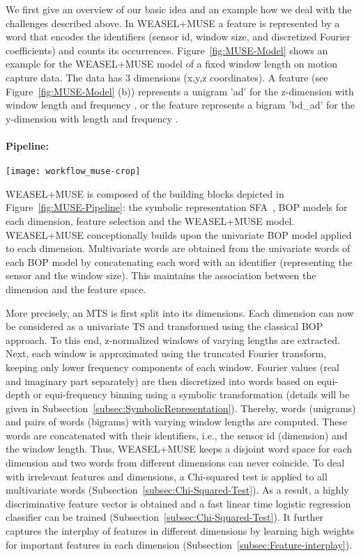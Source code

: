 \documentclass[sigconf]{acmart}
\begin{document}
We first give an overview of our basic idea and an example how we deal with the challenges described above. In WEASEL+MUSE a feature is represented by a word that encodes the identifiers (sensor id, window size, and discretized Fourier coefficients) and counts its occurrences. Figure~\ref{fig:MUSE-Model}  shows an example for the WEASEL+MUSE model of a fixed window length  on motion capture data. The data has 3 dimensions (x,y,z coordinates). A feature  (see Figure~\ref{fig:MUSE-Model} (b)) represents a unigram 'ad' for the z-dimension with window length  and frequency , or the feature  represents a bigram 'bd\_ad' for the y-dimension with length  and frequency .

\paragraph{Pipeline:}

\begin{figure*}
	\texttt{[image: workflow\_muse-crop]}
	\caption{WEASEL+MUSE Pipeline: Feature extraction, univariate Bag-of-Patterns (BOP) models and WEASEL+MUSE.\label{fig:MUSE-Pipeline}}
\end{figure*}

WEASEL+MUSE is composed of the building blocks depicted in Figure~\ref{fig:MUSE-Pipeline}: the symbolic representation SFA~\cite{SchaferH12}, BOP models for each dimension, feature selection and the WEASEL+MUSE model. 
WEASEL+MUSE conceptionally builds upon the univariate BOP model applied to each dimension. Multivariate words are obtained from the univariate words of each BOP model by concatenating each word with an identifier (representing the sensor and the window size). This maintains the association between the dimension and the feature space. 

More precisely, an MTS is first split into its dimensions. Each dimension can now be considered as a univariate TS and transformed using the classical BOP approach. To this end, z-normalized windows of varying lengths are extracted. Next, each window is approximated using the truncated Fourier transform, keeping only lower frequency components of each window. Fourier values (real and imaginary part separately) are then discretized into words based on equi-depth or equi-frequency binning using a symbolic transformation (details will be given in Subsection~\ref{subsec:SymbolicRepresentation}). Thereby, words (unigrams) and pairs of words (bigrams) with varying window lengths are computed. These words are concatenated with their identifiers, i.e., the sensor id (dimension) and the window length.
Thus, WEASEL+MUSE keeps a disjoint word space for each dimension and two words from different dimensions can never coincide. To deal with irrelevant features and dimensions, a Chi-squared test is applied to all multivariate words (Subsection~\ref{subsec:Chi-Squared-Test}). As a result, a highly discriminative feature vector is obtained and a fast linear time logistic regression classifier can be trained (Subsection~\ref{subsec:Chi-Squared-Test}). It further captures the interplay of features in different dimensions by learning high weights for important features in each dimension (Subsection~\ref{subsec:Feature-interplay}).
\end{document}

